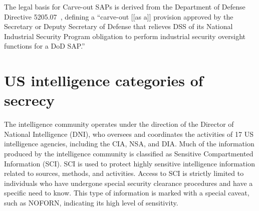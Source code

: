 The legal basis for Carve-out SAPs is derived from the Department of Defense Directive 5205.07~\cite{DODDirective5205.07}, defining
a ``carve-out [[as a]]  provision approved by the Secretary or Deputy Secretary of Defense that relieves
DSS of its National Industrial Security Program obligation to perform industrial security
oversight functions for a DoD SAP.''

\section{US intelligence categories of secrecy}
\label{2023-UFO-part-Perception-crash-retreivals--USICOS}


The intelligence community operates under the direction of the Director of National Intelligence (DNI), who oversees and coordinates the activities of 17 US intelligence agencies, including the CIA, NSA, and DIA. Much of the information produced by the intelligence community is classified as Sensitive Compartmented Information (SCI). SCI is used to protect highly sensitive intelligence information related to sources, methods, and activities. Access to SCI is strictly limited to individuals who have undergone special security clearance procedures and have a specific need to know. This type of information is marked with a special caveat, such as NOFORN, indicating its high level of sensitivity.

